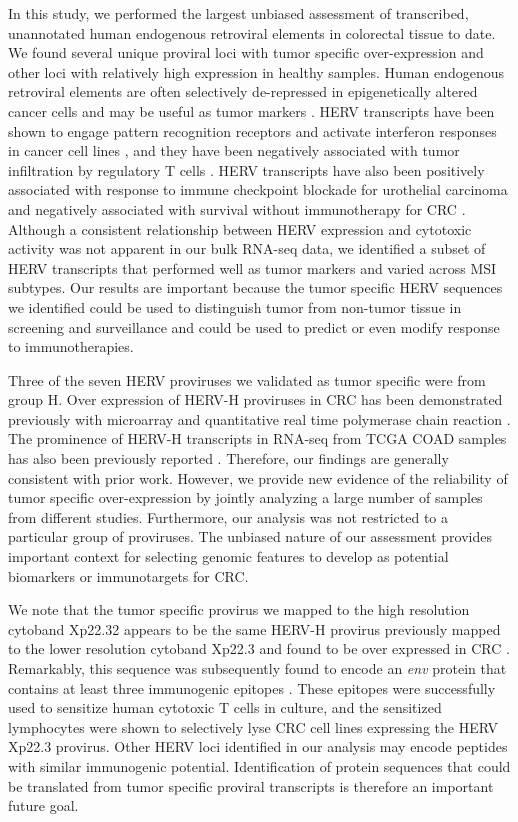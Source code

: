 In this study, we performed the largest unbiased assessment of transcribed, unannotated human endogenous retroviral elements in colorectal tissue to date.
We found several unique proviral loci with tumor specific over-expression and other loci with relatively high expression in healthy samples.
Human endogenous retroviral elements are often selectively de-repressed in epigenetically altered cancer cells and may be useful as tumor markers \citep{Babaian2016}.
HERV transcripts have been shown to engage pattern recognition receptors and activate interferon responses in cancer cell lines \citep{Chiappinelli2015, Roulois2015}, and they have been negatively associated with tumor infiltration by regulatory T cells \citep{Desai2017}.
HERV transcripts have also been positively associated with response to immune checkpoint blockade for urothelial carcinoma and negatively associated with survival without immunotherapy for CRC \citep{Solovyov2018}.
Although a consistent relationship between HERV expression and cytotoxic activity was not apparent in our bulk RNA-seq data, we identified a subset of HERV transcripts that performed well as tumor markers and varied across MSI subtypes.
Our results are important because the tumor specific HERV sequences we identified could be used to distinguish tumor from non-tumor tissue in screening and surveillance and could be used to predict or even modify response to immunotherapies.

Three of the seven HERV proviruses we validated as tumor specific were from group H.
Over expression of HERV-H proviruses in CRC has been demonstrated previously with microarray \citep{Perot2012} and quantitative real time polymerase chain reaction \citep{Perot2015}.
The prominence of HERV-H transcripts in RNA-seq from TCGA COAD samples has also been previously reported \citep{Desai2017, Attig2019}.
Therefore, our findings are generally consistent with prior work.
However, we provide new evidence of the reliability of tumor specific over-expression by jointly analyzing a large number of samples from different studies.
Furthermore, our analysis was not restricted to a particular group of proviruses.
The unbiased nature of our assessment provides important context for selecting genomic features to develop as potential biomarkers or immunotargets for CRC.

We note that the tumor specific provirus we mapped to the high resolution cytoband Xp22.32 appears to be the same HERV-H provirus previously mapped to the lower resolution cytoband Xp22.3 and found to be over expressed in CRC \citep{Wentzensen2007}.
Remarkably, this sequence was subsequently found to encode an \emph{env} protein that contains at least three immunogenic epitopes \citep{Mullins2012}.
These epitopes were successfully used to sensitize human cytotoxic T cells in culture, and the sensitized lymphocytes were shown to selectively lyse CRC cell lines expressing the HERV Xp22.3 provirus.
Other HERV loci identified in our analysis may encode peptides with similar immunogenic potential.
Identification of protein sequences that could be translated from tumor specific proviral transcripts is therefore an important future goal.

